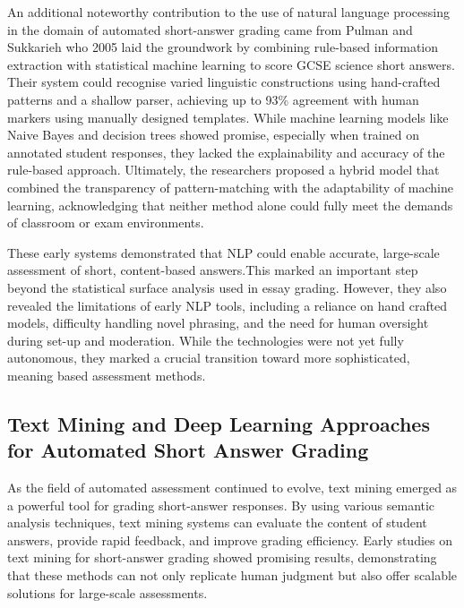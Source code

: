 \documentclass[a4paper,10pt]{article}
\begin{document}
An additional noteworthy contribution to the use of natural language processing in the domain of automated short-answer grading came from Pulman and Sukkarieh who 2005 laid the groundwork by combining rule-based information extraction with statistical machine learning to score GCSE science short answers\cite{pulman2005automatic}. Their system could recognise varied linguistic constructions using hand-crafted patterns and a shallow parser, achieving up to 93\% agreement with human markers using manually designed templates\cite{pulman2005automatic}. While machine learning models like Naive Bayes and decision trees showed promise, especially when trained on annotated student responses, they lacked the explainability and accuracy of the rule-based approach\cite{pulman2005automatic}. Ultimately, the researchers proposed a hybrid model that combined the transparency of pattern-matching with the adaptability of machine learning, acknowledging that neither method alone could fully meet the demands of classroom or exam environments\cite{pulman2005automatic}.\newline \newline

These early systems demonstrated that NLP could enable accurate, large-scale assessment of short, content-based answers.This marked an important step beyond the statistical surface analysis used in essay grading. However, they also revealed the limitations of early NLP tools, including a reliance on hand crafted models, difficulty handling novel phrasing, and the need for human oversight during set-up and moderation. While the technologies were not yet fully autonomous, they marked a crucial transition toward more sophisticated, meaning based assessment methods.\newline \newline

\subsection{Text Mining and Deep Learning Approaches for Automated Short Answer Grading}
As the field of automated assessment continued to evolve, text mining emerged as a powerful tool for grading short-answer responses. By using various semantic analysis techniques, text mining systems can evaluate the content of student answers, provide rapid feedback, and improve grading efficiency. Early studies on text mining for short-answer grading showed promising results, demonstrating that these methods can not only replicate human judgment but also offer scalable solutions for large-scale assessments.\newline\newline
\end{document}
